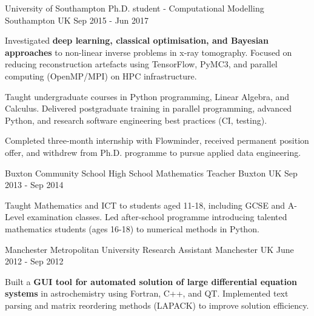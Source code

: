 \begin{cventries}
  \cventry
    {University of Southampton} %
    {Ph.D. student - Computational Modelling} %
    {Southampton UK} %
    {Sep 2015 - Jun 2017} %
    {
      \begin{cvitems} %
        \item {Investigated \textbf{deep learning, classical optimisation, and Bayesian approaches} to non-linear inverse problems in x-ray tomography. Focused on reducing reconstruction artefacts using TensorFlow, PyMC3, and parallel computing (OpenMP/MPI) on HPC infrastructure.}
        \item {Taught undergraduate courses in Python programming, Linear Algebra, and Calculus. Delivered postgraduate training in parallel programming, advanced Python, and research software engineering best practices (CI, testing).}
        \item {Completed three-month internship with Flowminder, received permanent position offer, and withdrew from Ph.D. programme to pursue applied data engineering.}
      \end{cvitems}
    }

  \cventry
    {Buxton Community School} %
    {High School Mathematics Teacher} %
    {Buxton UK} %
    {Sep 2013 - Sep 2014} %
    {
      \begin{cvitems} %
        \item {Taught Mathematics and ICT to students aged 11-18, including GCSE and A-Level examination classes. Led after-school programme introducing talented mathematics students (ages 16-18) to numerical methods in Python.}
      \end{cvitems}
    }

  \cventry
    {Manchester Metropolitan University} %
    {Research Assistant} %
    {Manchester UK} %
    {June 2012 - Sep 2012} %
    {
      \begin{cvitems} %
        \item {Built a \textbf{GUI tool for automated solution of large differential equation systems} in astrochemistry using Fortran, C++, and QT. Implemented text parsing and matrix reordering methods (LAPACK) to improve solution efficiency.}
      \end{cvitems}
    }

\end{cventries}
